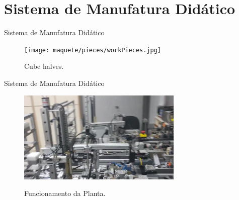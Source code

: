 \section{Sistema de Manufatura Didático}

\begin{frame}{Sistema de Manufatura Didático}
\begin{figure}[H]
  \centering
  \texttt{[image: maquete/pieces/workPieces.jpg]}
  \caption{Cube halves.}
  \label{fig:cubeHalves}
\end{figure}
\end{frame}

\begin{frame}{Sistema de Manufatura Didático}
\centering
   \begin{figure}[ht]
\href{run:../../videos/timelapse.avi?start=75&stop=85}{\includegraphics[width=0.7\textwidth]{../../videos/TCCVIDEO_cycle.jpg}}
  \caption{Funcionamento da Planta.}
   \end{figure}
\end{frame}

